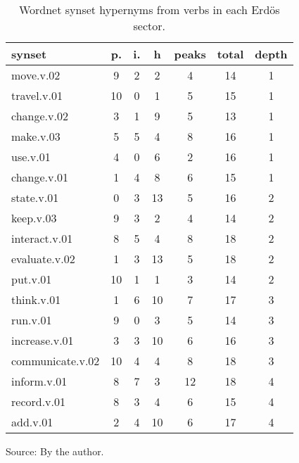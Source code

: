 \begin{table}[h!]
\begin{center}
\caption{Wordnet synset hypernyms from verbs in each Erd\"os sector.}
	\label{tab:wnvh}
\begin{tabular}{| l || c | c | c || c | c | c |}\hline
{\bf synset} & {\bf p.} & {\bf i.} & {\bf h} & {\bf peaks} & {\bf total} & {\bf depth} \\\hline\hline
move.v.02 & 9  & 2  & 2  & 4  & 14  & 1 \\
travel.v.01 & 10  & 0  & 1  & 5  & 15  & 1 \\
change.v.02 & 3  & 1  & 9  & 5  & 13  & 1 \\
make.v.03 & 5  & 5  & 4  & 8  & 16  & 1 \\
use.v.01 & 4  & 0  & 6  & 2  & 16  & 1 \\
change.v.01 & 1  & 4  & 8  & 6  & 15  & 1 \\\hline
state.v.01 & 0  & 3  & 13  & 5  & 16  & 2 \\
keep.v.03 & 9  & 3  & 2  & 4  & 14  & 2 \\
interact.v.01 & 8  & 5  & 4  & 8  & 18  & 2 \\
evaluate.v.02 & 1  & 3  & 13  & 5  & 18  & 2 \\
put.v.01 & 10  & 1  & 1  & 3  & 14  & 2 \\\hline
think.v.01 & 1  & 6  & 10  & 7  & 17  & 3 \\
run.v.01 & 9  & 0  & 3  & 5  & 14  & 3 \\
increase.v.01 & 3  & 3  & 10  & 6  & 16  & 3 \\
communicate.v.02 & 10  & 4  & 4  & 8  & 18  & 3 \\\hline
inform.v.01 & 8  & 7  & 3  & 12  & 18  & 4 \\
record.v.01 & 8  & 3  & 4  & 6  & 15  & 4 \\
add.v.01 & 2  & 4  & 10  & 6  & 17  & 4 \\\hline
\end{tabular}
\begin{flushleft}\footnotesize
		Source: By the author.\
\end{flushleft}
\end{center}
\end{table}
